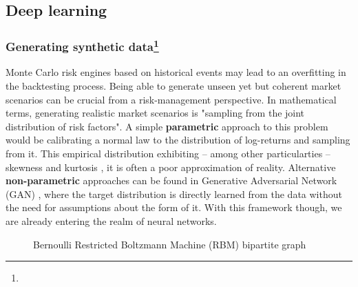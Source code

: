\subsection{Deep learning}

\subsubsection*{Generating synthetic data\footnote{}}

Monte Carlo risk engines based on historical events may lead to an overfitting in the backtesting process. Being able to generate unseen yet but coherent market scenarios can be crucial from a risk-management perspective.
In mathematical terms, generating realistic market scenarios is "sampling from the joint distribution of risk factors". A simple \textbf{parametric} approach to this problem would be calibrating a normal law to the distribution of log-returns and sampling from it. This empirical distribution exhibiting -- among other particularties -- skewness and kurtosis \cite{cont2001empirical}, it is often a poor approximation of reality.\newline
Alternative \textbf{non-parametric} approaches can be found in Generative Adversarial Network (GAN) \cite{goodfellow2014generative}, where the target distribution is directly learned from the data without the need for assumptions about the form of it. With this framework though, we are already entering the realm of neural networks.


\begin{figure}[H]
    \centering
    
    \caption{Bernoulli Restricted Boltzmann Machine (RBM) bipartite graph}
    \label{fig:rbm}
\end{figure}



